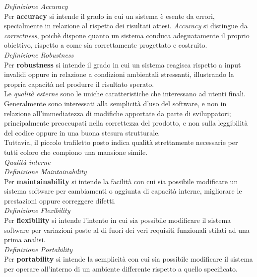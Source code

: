 \documentclass{article}
\begin{document}
\textit{Definizione Accuracy}\\
Per \textbf{accuracy} si intende il grado in cui un sistema è esente da errori, specialmente in relazione al rispetto dei risultati attesi. \textit{Accuracy} si distingue da \textit{correctness}, poichè dispone quanto un sistema conduca adeguatamente il proprio obiettivo, rispetto a come sia correttamente progettato e costruito.\vspace*{14pt}\\
\textit{Definizione Robustness}\\
Per \textbf{robustness} si intende il grado in cui un sistema reagisca rispetto a input invalidi oppure in relazione a condizioni ambientali stressanti, illustrando la propria capacità nel produrre il risultato sperato.\vspace*{14pt}\\
Le \textit{qualità esterne} sono le uniche caratteristiche che interessano ad utenti finali. Generalmente sono interessati alla semplicità d'uso del software, e non in relazione all'immediatezza di modifiche apportate da parte di sviluppatori; principalmente preoccupati nella correttezza del prodotto, e non sulla leggibilità del codice oppure in una buona stesura strutturale.\vspace*{14pt}\\
Tuttavia, il piccolo trafiletto posto indica qualità strettamente necessarie per tutti coloro che compiono una mansione simile.\vspace*{14pt}\\
\textit{Qualità interne}\\
\textit{Definizione Maintainability}\\
Per \textbf{maintainability} si intende la facilità con cui sia possibile modificare un sistema software per cambiamenti o aggiunta di capacità interne, migliorare le prestazioni oppure correggere difetti.\vspace*{14pt}\\
\textit{Definizione Flexibility}\\
Per \textbf{flexibility} si intende l'intento in cui sia possibile modificare il sistema software per variazioni poste al di fuori dei veri requisiti funzionali stilati ad una prima analisi.\vspace*{14pt}\\
\textit{Definizione Portability}\\
Per \textbf{portability} si intende la semplicità con cui sia possibile modificare il sistema per operare all'interno di un ambiente differente rispetto a quello specificato.\vspace*{14pt}\\
\end{document}
